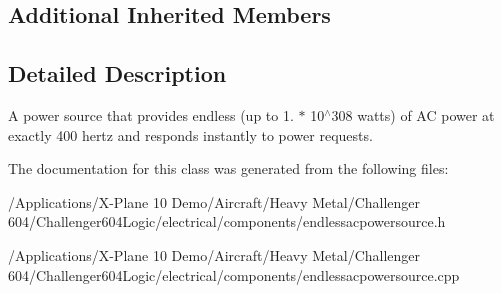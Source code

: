 \subsection*{Additional Inherited Members}


\subsection{Detailed Description}
A power source that provides endless (up to 1. $\ast$ 10$^\wedge$308 watts) of A\-C power at exactly 400 hertz and responds instantly to power requests. 

The documentation for this class was generated from the following files\-:\begin{DoxyCompactItemize}
\item 
/\-Applications/\-X-\/\-Plane 10 Demo/\-Aircraft/\-Heavy Metal/\-Challenger 604/\-Challenger604\-Logic/electrical/components/endlessacpowersource.\-h\item 
/\-Applications/\-X-\/\-Plane 10 Demo/\-Aircraft/\-Heavy Metal/\-Challenger 604/\-Challenger604\-Logic/electrical/components/endlessacpowersource.\-cpp\end{DoxyCompactItemize}
